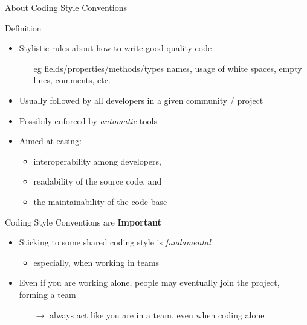 \documentclass[presentation]{beamer}
\begin{document}
\begin{frame}[allowframebreaks]{About Coding Style Conventions}
    \begin{block}{Definition}
        \begin{itemize}
            \item Stylistic rules about how to write good-quality code
            \begin{itemize}
                \item[eg] fields/properties/methods/types names, usage of white spaces, empty lines, comments, etc.
            \end{itemize}

            \item Usually \alert{followed} by all developers in a given community / project
            
            \item Possibily \alert{enforced} by \emph{automatic} tools
            
            \item Aimed at easing:
            \begin{itemize}
                \item interoperability among developers,
                \item readability of the source code, and
                \item the maintainability of the code base
            \end{itemize}
        \end{itemize}
    \end{block}

    \begin{alertblock}{Coding Style Conventions are \textbf{Important}}
        \begin{itemize}
            \item Sticking to some \alert{shared} coding style is \emph{fundamental}
            \begin{itemize}
                \item  especially, when working in \alert{teams}
            \end{itemize}
            
            \item Even if you are working alone, people may eventually join the project, forming a team
            \begin{itemize}
                \item[$\rightarrow$] always act like you are in a team, even when coding alone
            \end{itemize}


\end{itemize}
\end{alertblock}
\end{frame}
\end{document}
